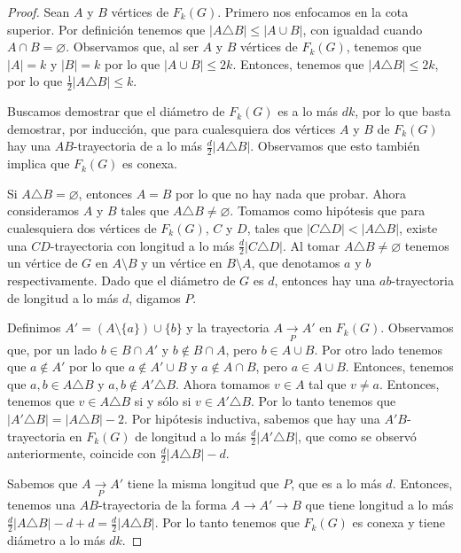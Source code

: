 \begin{proof}
Sean $A$ y $B$ v\'ertices de $F_{k}(G)$. Primero nos enfocamos en la cota
superior. Por definici\'on tenemos que $|A \triangle B| \leq |A \cup B|$, con
igualdad cuando $A \cap B = \varnothing$. Observamos que, al ser $A$ y $B$
v\'ertices de $F_{k}(G)$, tenemos que $|A|=k$ y $|B|=k$ por lo que $|A \cup B|
\le 2k$. Entonces, tenemos que $|A \triangle B| \leq 2k$, por lo que
$\frac{1}{2} |A \triangle B| \leq k$.

Buscamos demostrar que el di\'ametro de $F_{k}(G)$ es a lo m\'as $d k$, por
lo que basta demostrar, por inducci\'on, que para cualesquiera dos v\'ertices
$A$ y $B$ de $F_{k}(G)$ hay una $AB$-trayectoria de a lo m\'as
$\frac{d}{2}|A\triangle B|$. Observamos que esto tambi\'en implica que
$F_{k}(G)$ es conexa.

Si $A\triangle B=\varnothing$, entonces $A=B$ por lo que no hay nada que probar.
Ahora consideramos $A$ y $B$ tales que $A\triangle B \neq \varnothing$. Tomamos
como hip\'otesis que para cualesquiera dos v\'ertices de $F_{k}(G)$, $C$ y $D$,
tales que $|C\triangle D|<|A \triangle B|$, existe una $CD$-trayectoria con
longitud a lo m\'as $\frac{d}{2}|C\triangle D|$. Al tomar $A\triangle B
\neq \varnothing$ tenemos un v\'ertice de $G$ en $A\setminus B$ y un v\'ertice
en $B\setminus A$, que denotamos $a$ y $b$ respectivamente. Dado que el
di\'ametro de $G$ es $d$, entonces hay una $ab$-trayectoria de longitud a
lo m\'as $d$, digamos $P$.

Definimos $A'=(A\setminus \{a\})\cup \{b\}$ y la trayectoria $A\xrightarrow[P]{}
A'$ en $F_{k}(G)$. Observamos que, por un lado $b\in B\cap A'$ y $b\notin B\cap
A$, pero $b\in A\cup B$. Por otro lado tenemos que $a\notin A'$ por lo que
$a\notin A'\cup B$ y $a\notin A\cap B$, pero $a\in A\cup B$. Entonces, tenemos
que $a,b \in A\triangle B$ y $a,b \notin A'\triangle B$. Ahora tomamos $v\in A$
tal que $v \neq a$. Entonces, tenemos que $v \in A\triangle B$ si y s\'olo si
$v\in A'\triangle B$. Por lo tanto tenemos que $|A'\triangle B|=|A \triangle B|-
2$. Por hip\'otesis inductiva, sabemos que hay una $A'B$-trayectoria en
$F_{k}(G)$ de longitud a lo m\'as $\frac{d}{2}|A'\triangle B|$, que como se
observ\'o anteriormente, coincide con $\frac{d}{2}|A\triangle B| - d$.

Sabemos que $A\xrightarrow[P]{} A'$ tiene la misma longitud que $P$, que es a lo
m\'as $d$. Entonces, tenemos una $AB$-trayectoria de la forma $A\rightarrow
A'\rightarrow B$ que tiene longitud a lo m\'as $\frac{d}{2}|A\triangle
B|-d +d =\frac{d}{2}|A\triangle B|$. Por lo tanto tenemos que
$F_{k}(G)$ es conexa y tiene di\'ametro a lo m\'as $d k$.


\end{proof}
